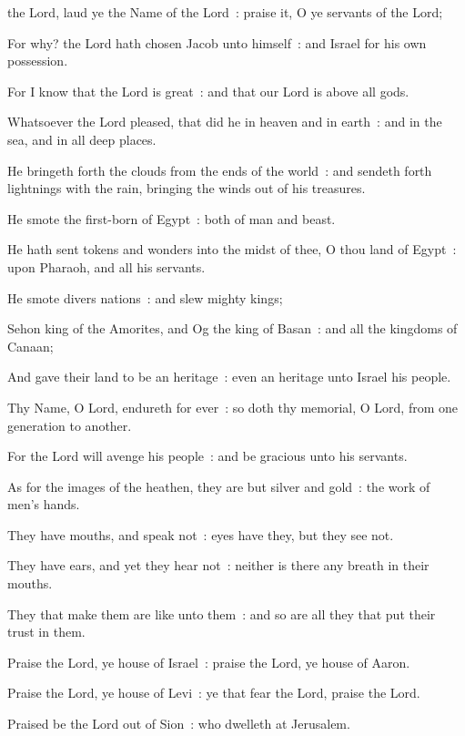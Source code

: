  the Lord, laud ye the Name of the Lord~: praise it, O ye servants of the Lord;\par
{}
For why? the Lord hath chosen Jacob unto himself~: and Israel for his own possession.\par
{}For I know that the Lord is great~: and that our Lord is above all gods.\par
{}Whatsoever the Lord pleased, that did he in heaven and in earth~: and in the sea, and in all deep places.\par
{}He bringeth forth the clouds from the ends of the world~: and sendeth forth lightnings with the rain, bringing the winds out of his treasures.\par
{}He smote the first-born of Egypt~: both of man and beast.\par
{}He hath sent tokens and wonders into the midst of thee, O thou land of Egypt~: upon Pharaoh, and all his servants.\par
{}He smote divers nations~: and slew mighty kings;\par
{}Sehon king of the Amorites, and Og the king of Basan~: and all the kingdoms of Canaan;\par
{}And gave their land to be an heritage~: even an heritage unto Israel his people.\par
{}Thy Name, O Lord, endureth for ever~: so doth thy memorial, O Lord, from one generation to another.\par
{}For the Lord will avenge his people~: and be gracious unto his servants.\par
{}As for the images of the heathen, they are but silver and gold~: the work of men's hands.\par
{}They have mouths, and speak not~: eyes have they, but they see not.\par
{}They have ears, and yet they hear not~: neither is there any breath in their mouths.\par
{}They that make them are like unto them~: and so are all they that put their trust in them.\par
{}Praise the Lord, ye house of Israel~: praise the Lord, ye house of Aaron.\par
{}Praise the Lord, ye house of Levi~: ye that fear the Lord, praise the Lord.\par
{}Praised be the Lord out of Sion~: who dwelleth at Jerusalem.\par

